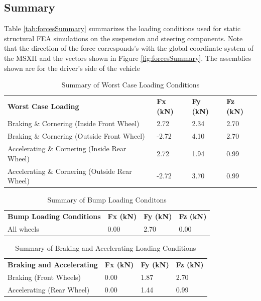 \documentclass[12pt]{article}
\begin{document}
\subsection{Summary}
Table \ref{tab:forcesSummary} summarizes the loading conditions used for static structural FEA simulations on the suspension and steering components. Note that the direction of the force corresponds's with the global coordinate system of the MSXII and the vectors shown in Figure \ref{fig:forcesSummary}. The assemblies shown are for the driver's side of the vehicle

\begin{table}[h!]
\centering
\caption{Summary of Worst Case Loading Conditions}
\label{tab:summary}
\begin{tabular}{llll}
\textbf{Worst Case Loading}  			       & \textbf{Fx (kN)} & \textbf{Fy (kN)} & \textbf{Fz (kN)} \\
Braking \& Cornering (Inside Front Wheel)      & 2.72             & 2.34             & 2.70             \\
Braking \& Cornering (Outside Front Wheel)     & -2.72            & 4.10             & 2.70             \\
Accelerating \& Cornering (Inside Rear Wheel)  & 2.72             & 1.94             & 0.99             \\
Accelerating \& Cornering (Outside Rear Wheel) & -2.72            & 3.70             & 0.99            
\end{tabular}
\end{table}

\begin{table}[h!]
\centering
\caption{Summary of Bump Loading Conditons}
\label{tab:summary}
\begin{tabular}{llll}
\textbf{Bump Loading Conditions}  			    & \textbf{Fx (kN)} & \textbf{Fy (kN)} & \textbf{Fz (kN)} \\
All wheels										& 0.00            & 2.70             & 0.00            
\end{tabular}
\end{table}

\begin{table}[h!]
\centering
\caption{Summary of Braking and Accelerating Loading Conditions}
\label{tab:summary}
\begin{tabular}{llll}
\textbf{Braking and Accelerating}  			       & \textbf{Fx (kN)} & \textbf{Fy (kN)} & \textbf{Fz (kN)} \\
Braking (Front Wheels)      					   & 0.00             & 1.87             & 2.70             \\
Accelerating (Rear Wheel)  					   & 0.00             & 1.44             & 0.99             \\
\end{tabular}
\end{table}
\end{document}
